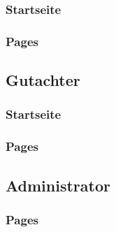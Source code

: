 \subsubsection{Startseite}

\subsubsection{Pages}

\subsection{Gutachter}

\subsubsection{Startseite}

\subsubsection{Pages}

\subsection{Administrator}

\subsubsection{Pages}
